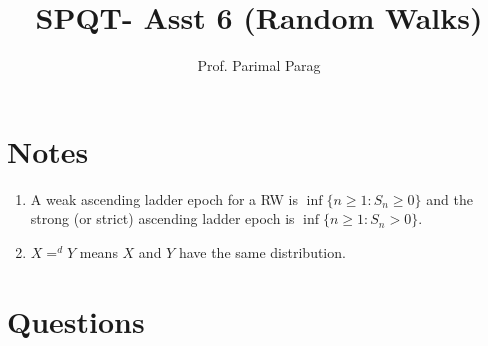 \documentclass[a4paper,10pt]{article}
\title{SPQT- Asst 6 (Random Walks)}
\author{Prof. Parimal Parag}
\begin{document}
\maketitle
\section{Notes}
\begin{enumerate}
	\item A weak ascending ladder epoch for a RW is $\inf \{n \geq 1: S_n \geq 0\}$ and the strong (or strict) ascending ladder epoch is $\inf \{n \geq 1: S_n > 0\}$.
	\item $X=^d Y$ means $X$ and $Y$ have the same distribution.
\end{enumerate}
\section{Questions}
\end{document}
